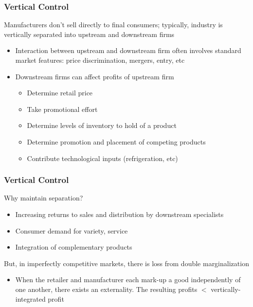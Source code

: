 \begin{frame}
\frametitle{Vertical Control}

Manufacturers don't sell directly to final consumers; typically, industry is
vertically separated into upstream and downstream firms

\begin{itemize}
\item Interaction between upstream and downstream firm often involves
standard market features: price discrimination, mergers, entry, etc

\item Downstream firms can affect profits of upstream firm

\begin{itemize}
\item Determine retail price

\item Take promotional effort

\item Determine levels of inventory to hold of a product

\item Determine promotion and placement of competing products

\item Contribute technological inputs (refrigeration, etc)
\end{itemize}
\end{itemize}
\end{frame}


\begin{frame}
\frametitle{Vertical Control}

Why maintain separation?

\begin{itemize}
\item Increasing returns to sales and distribution by downstream specialists

\item Consumer demand for variety, service

\item Integration of complementary products
\end{itemize}
\end{frame}

\begin{frame}
But, in imperfectly competitive markets, there is loss from double
marginalization

\begin{itemize}
\item When the retailer and manufacturer each mark-up a good independently
of one another, there exists an externality. The resulting profits $<$
vertically-integrated profit
\end{itemize}
\end{frame}

